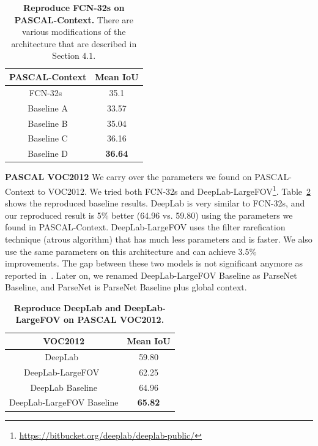 \documentclass{article} %
\begin{document}
\begin{table}[!htb]
	\centering
	\begin{tabular}{c|c}
		PASCAL-Context & Mean IoU\\
		\hline\hline
		FCN-32s~\tablefootnote{\url{https://gist.github.com/shelhamer/80667189b218ad570e82\#file-readme-md}} & 35.1\\
		\hline
		Baseline A & 33.57\\
		Baseline B & 35.04\\
		Baseline C & 36.16\\
		Baseline D & \textbf{36.64}\\
		\hline
	\end{tabular}
	\caption{\textbf{Reproduce FCN-32s on PASCAL-Context.} There are various modifications of the architecture that are described in Section $4.1$.}\label{tab:pascalcontextbase}
\end{table}

\noindent\textbf{PASCAL VOC2012} We carry over the parameters we found on PASCAL-Context to VOC2012. We tried both FCN-32s and DeepLab-LargeFOV\footnote{\url{https://bitbucket.org/deeplab/deeplab-public/}}. Table~\ref{tab:voc2012base} shows the reproduced baseline results. DeepLab is very similar to FCN-32s, and our reproduced result is 5\% better (64.96 vs. 59.80) using the parameters we found in PASCAL-Context. DeepLab-LargeFOV uses the filter rarefication technique (atrous algorithm) that has much less parameters and is faster. We also use the same parameters on this architecture and can achieve 3.5\% improvements. The gap between these two models is not significant anymore as reported in~\cite{chen2014semantic}. Later on, we renamed DeepLab-LargeFOV Baseline as ParseNet Baseline, and ParseNet is ParseNet Baseline plus global context.

\begin{table}[!htb]
	\centering
	\begin{tabular}{c|c}
		VOC2012 & Mean IoU\\
		\hline\hline
		DeepLab~\cite{chen2014semantic} & 59.80\\
		DeepLab-LargeFOV~\cite{chen2014semantic} & 62.25\\
		\hline
		DeepLab Baseline & 64.96\\
		DeepLab-LargeFOV Baseline & \textbf{65.82}\\
		\hline
	\end{tabular}
	\caption{\textbf{Reproduce DeepLab and DeepLab-LargeFOV on PASCAL VOC2012.}}\label{tab:voc2012base}
\end{table}
\end{document}
